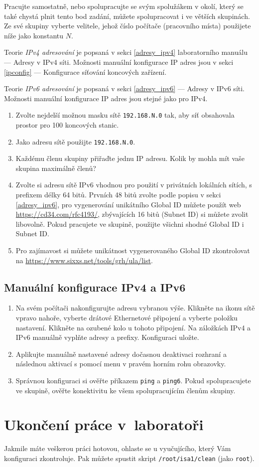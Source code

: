 Pracujte samostatně, nebo spolupracujte se svým spolužákem v okolí, který se také
chystá plnit tento bod zadání, můžete spolupracovat i ve větších skupinách.
Ze své skupiny vyberte velitele, jehož číslo počítače (pracovního místa)
použijete níže jako konstantu $N$.

Teorie \emph{IPv4 adresování} je popsaná v sekci \ref{adresy_ipv4} laboratorního manuálu --- Adresy v IPv4 síti.
Možnosti manuální konfigurace IP adres jsou v sekci \ref{ipconfig} --- Konfigurace síťování koncových zařízení.

Teorie \emph{IPv6 adresování} je popsaná v sekci \ref{adresy_ipv6} --- Adresy v IPv6 síti.
Možnosti manuální konfigurace IP adres jsou stejné jako pro IPv4.

\begin{enumerate}
    \item Zvolte nejdelší možnou masku sítě \texttt{192.168.N.0} tak, aby síť obsahovala prostor pro 100 koncových stanic.
    \item Jako adresu sítě použijte \texttt{192.168.N.0}.
    \item Každému členu skupiny přiřaďte jednu IP adresu. Kolik by mohla mít
      vaše skupina maximálně členů?
    \item Zvolte si adresu sítě IPv6 vhodnou pro použití v privátních lokálních
        sítích, s prefixem délky 64 bitů. Prvních 48 bitů zvolte podle popisu v
        sekci \ref{adresy_ipv6}, pro vygenerování unikátního Global ID můžete
        použít web \url{https://cd34.com/rfc4193/}, zbývajících 16 bitů (Subnet
        ID) si můžete zvolit libovolně. Pokud pracujete ve skupině, použijte
        všichni shodné Global ID i Subnet ID.
    \item Pro zajímavost si můžete unikátnost vygenerovaného Global ID
        zkontrolovat na \url{https://www.sixxs.net/tools/grh/ula/list}.
\end{enumerate}

\subsection{Manuální konfigurace IPv4 a IPv6}

\begin{enumerate}
    \item Na svém počítači
      nakonfigurujte adresu vybranou výše. Klikněte na ikonu sítě vpravo nahoře,
      vyberte drátové Ethernetové připojení a vyberte položku nastavení.
      Klikněte na ozubené kolo u tohoto připojení. Na záložkách IPv4 a IPv6
      manuálně vyplňte adresy a prefixy. Konfiguraci uložte.
    \item Aplikujte manuálně nastavené adresy dočasnou deaktivaci rozhraní a
      následnou aktivací s pomocí menu v pravém horním rohu obrazovky.
    \item Správnou konfiguraci si ověřte příkazem {\tt ping} a {\tt ping6}. Pokud
      spolupracujete ve skupině, ověřte konektivitu ke všem spolupracujícím
      členům skupiny.
\end{enumerate}

\section{Ukončení práce v~laboratoři}
Jakmile máte veškerou práci hotovou, ohlaste se u vyučujícího, který Vám
konfiguraci zkontroluje. Pak můžete spustit skript {\tt /root/isa1/clean} (jako
\texttt{root}).
